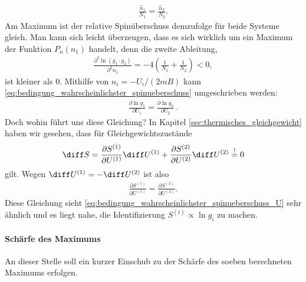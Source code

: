 \begin{align*}
    \frac{\hat{n}_1}{N_1} = \frac{\hat{n}_2}{N_2} . 
\end{align*}
Am Maximum ist der relative Spinüberschuss demzufolge für beide Systeme gleich. Man kann sich leicht überzeugen, dass es sich wirklich um ein Maximum der Funktion $P_n(n_1)$ handelt, denn die zweite Ableitung,
\begin{align*}
    \frac{\partial ^2\ln(g_1\cdot g_2)}{\partial ^2n_1} = -4\left( \frac{1}{N_1}+\frac{1}{N_2} \right) < 0,
\end{align*}
ist kleiner als $0$.
Mithilfe von $n_i= -U_i/(2mB)$ kann \eqref{eq:bedingung_wahrscheinlichster_spinueberschuss} umgeschrieben werden:
\begin{align}
    \label{eq:bedingung_wahrscheinlichster_spinueberschuss_U}
    \boxed{\frac{\partial \ln g_1}{\partial U_1}  = \frac{\partial \ln g_2}{\partial U_2} }\:.
\end{align}
Doch wohin führt uns diese Gleichung? In Kapitel \ref{sec:thermisches_gleichgewicht} haben wir gesehen, dass für Gleichgewichtszustände
\begin{align*}
    \diff S = \frac{\partial S^{(1)}}{\partial U^{(1)}}\diff U^{(1)}+ \frac{\partial S^{(2)}}{\partial U^{(2)}}\diff U^{(2)} \overset{!}{=}0 
\end{align*}
gilt. Wegen $\diff U^{(1)} = -\diff U^{(2)}$ ist also 
\begin{align*}
    \frac{\partial S^{(1)}}{\partial U^{(1)}} = \frac{\partial S^{(2)}}{\partial U^{(2)}}. 
\end{align*}
Diese Gleichung sieht \eqref{eq:bedingung_wahrscheinlichster_spinueberschuss_U} sehr ähnlich und es liegt nahe, die Identifizierung $S^{(i)}\propto \ln g_i$ zu machen. 


\paragraph*{Schärfe des Maximums}

An dieser Stelle soll ein kurzer Einschub zu der Schärfe des soeben berechneten Maximums erfolgen. 

